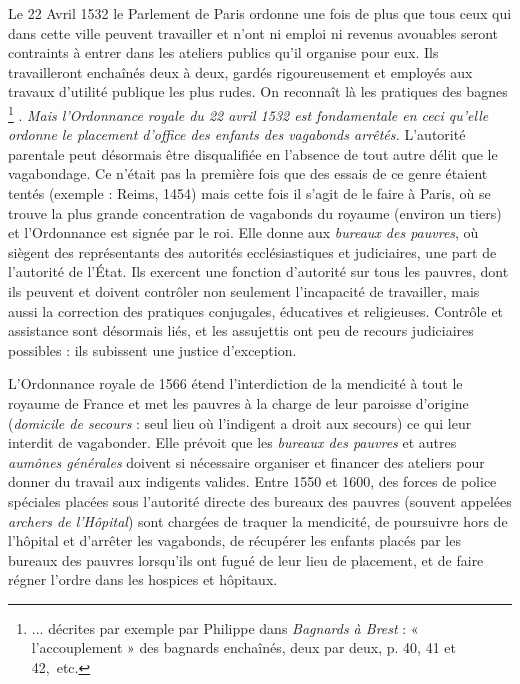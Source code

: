  Le 22 Avril 1532 le Parlement de Paris ordonne une fois de plus que tous ceux qui dans cette ville peuvent travailler et n'ont ni emploi ni revenus avouables seront contraints à entrer dans les ateliers publics qu'il organise pour eux. Ils travailleront enchaînés deux à deux, gardés rigoureusement et employés aux travaux d'utilité publique les plus rudes. On reconnaît là les pratiques des bagnes%
\footnote{... décrites par exemple par Philippe  dans \emph{Bagnards à Brest} : « l'accouplement » des bagnards enchaînés, deux par deux, p. 40, 41 et 42,~etc.}%
. \emph{Mais l'Ordonnance royale du 22 avril 1532 est fondamentale en ceci qu'elle ordonne le placement d'office des enfants des vagabonds arrêtés.} L'autorité parentale peut désormais être disqualifiée en l'absence de tout autre délit que le vagabondage. Ce n'était pas la première fois que des essais de ce genre étaient tentés (exemple : Reims, 1454) mais cette fois il s'agit de le faire à Paris, où se trouve la plus grande concentration de vagabonds du royaume (environ un tiers) et l'Ordonnance est signée par le roi. Elle donne aux \emph{bureaux des pauvres}, où siègent des représentants des autorités ecclésiastiques et judiciaires, une part de l'autorité de l'État. Ils exercent une fonction d'autorité sur tous les pauvres, dont ils peuvent et doivent contrôler non seulement l'incapacité de travailler, mais aussi la correction des pratiques conjugales, éducatives et religieuses. Contrôle et assistance sont désormais liés, et les assujettis ont peu de recours judiciaires possibles : ils subissent une justice d'exception. 

 L'Ordonnance royale de 1566 étend l'interdiction de la mendicité à tout le royaume de France et met les pauvres à la charge de leur paroisse d'origine (\emph{domicile de secours} : seul lieu où l'indigent a droit aux secours) ce qui leur interdit de vagabonder. Elle prévoit que les \emph{bureaux des pauvres} et autres \emph{aumônes générales} doivent si nécessaire organiser et financer des ateliers pour donner du travail aux indigents valides. Entre 1550 et 1600, des forces de police spéciales placées sous l'autorité directe des {bureaux des pauvres} (souvent appelées \emph{archers de l'Hôpital}) sont chargées de traquer la mendicité, de poursuivre hors de l'hôpital et d'arrêter les vagabonds, de récupérer les enfants placés par les bureaux des pauvres lorsqu'ils ont fugué de leur lieu de placement, et de faire régner l'ordre dans les hospices et hôpitaux. 

